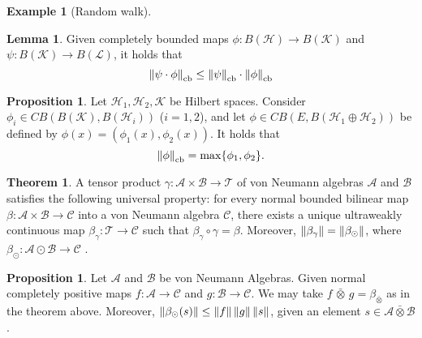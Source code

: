 \documentclass[10pt,a4paper]{amsart}
\theoremstyle{definition}
\theoremstyle{definition}
\newtheorem{example}[definition]{Example}
\theoremstyle{definition}
\newtheorem{lemma}[definition]{Lemma}
\theoremstyle{definition}
\newtheorem{proposition}[definition]{Proposition}
\theoremstyle{definition}
\theoremstyle{definition}
\newtheorem{theorem}[definition]{Theorem}
\begin{document}
\begin{example}[Random walk]
\begin{comment}
\begin{proposition} \cite[Proposition 3.2.2]{effrosOperatorSpaces2000} \label{prop:cb_dual}
  Given $C^*$-algebras $\mathcal{A}$ and $\mathcal{B}$, and a completely bounded mapping $\phi : A \to B$, we have
\[
\|\phi^*\|_{\text{cb}} =  \|\phi\|_{\text{cb}}.
\]
\end{proposition}

\end{comment}

\begin{lemma} \cite[p.19]{pisierIntroductionOperatorSpace2003} \label{lem:cb_comp_submult}
  Given completely bounded maps $\phi: B (\mathcal{H}) \to B (\mathcal{K}) $ and $\psi: B (\mathcal{K}) \to B (\mathcal{L})$, it holds that
  $$ \left\lVert \psi \cdot \phi \right\rVert_{\text{cb}} \leq \left\lVert \psi \right\rVert_{\text{cb}} \cdot \left\lVert \phi \right\rVert_{\text{cb}}  $$
\end{lemma}

\begin{proposition} \label{prop:dirsum_cb} \cite[Exercise 2.1.3.]{pisierIntroductionOperatorSpace2003}
  Let $\mathcal{H}_1, \mathcal{H}_2,  \mathcal{K} $ be Hilbert spaces.   Consider $\phi_i \in CB(B(\mathcal{K}), B(\mathcal{H}_i))$ ($i = 1,2$), and let $\phi \in 
  CB(E, B(\mathcal{H}_1 \oplus  \mathcal{H}_2))$ be defined by $\phi(x) = (\phi_1(x),  \phi_2(x))$. It holds that 
  $$\left\lVert \phi \right\rVert_{\text{cb}} = \max \{ \phi_1, \phi_2 \}.$$
\end{proposition}

\begin{theorem} \cite[Theorem 112 XI]{westerbaanCategoryNeumannAlgebras2019} \label{thm:beta_alg_eq_beta_gamma}
A tensor product $\gamma\colon \mathcal{A} \times \mathcal{B} \to \mathcal{T}$ of von Neumann algebras $\mathcal{A}$ and $\mathcal{B}$ satisfies the following universal property: for every normal bounded bilinear map $\beta\colon  \mathcal{A} \times  \mathcal{B} \to \mathcal{C}$ into a von Neumann algebra $\mathcal{C}$, there exists a unique ultraweakly continuous map $\beta_\gamma\colon \mathcal{T} \to \mathcal{C}$ such that $\beta_\gamma \circ \gamma = \beta$. Moreover, $ \left\lVert \beta_\gamma \right\rVert = \left\lVert \beta_\odot \right\rVert$, where $
\beta_\odot\colon  \mathcal{A} \odot  \mathcal{B} \to \mathcal{C} 
$ .
\end{theorem}

\begin{proposition} \cite[Proof 115 III] {westerbaanCategoryNeumannAlgebras2019} \label{prop:norm_beta_alg}
  Let  $\mathcal{A}$ and $\mathcal{B}$ be von Neumann Algebras.
  Given normal completely positive maps $f:\mathcal{A} \to \mathcal{C}$ and $g:\mathcal{B} \to \mathcal{C}$. We may take $ f \, \bar{\otimes} \, g = \beta_{\bar{\otimes}}$ as in the theorem above. Moreover, $\left\lVert \beta_\odot(s) \right\rVert \leq \left\lVert f \right\rVert\left\lVert g \right\rVert\left\lVert s \right\rVert$, given an element $s\in \mathcal{A} \bar{\otimes} \mathcal{B}$.
\end{proposition}



\end{example}
\end{document}
